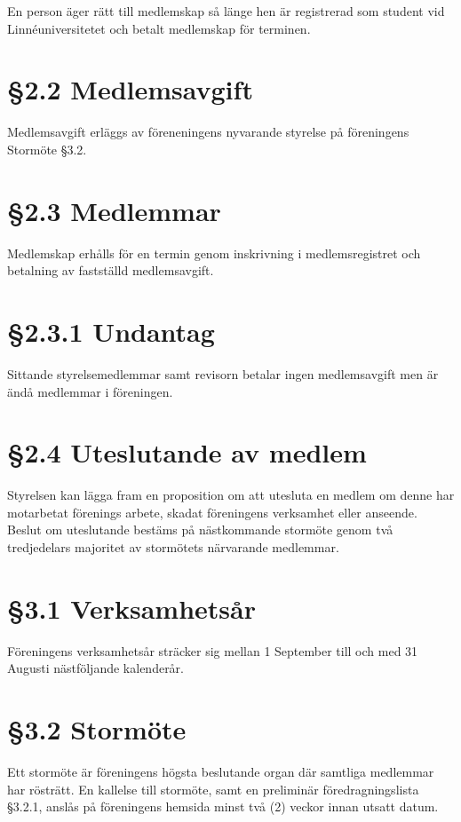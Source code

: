 \documentclass[]{article}
\begin{document}
En person äger rätt till medlemskap så länge hen är registrerad som
student vid Linnéuniversitetet och betalt medlemskap för terminen.

\section{§2.2 Medlemsavgift}\label{medlemsavgift}

Medlemsavgift erläggs av föreneningens nyvarande styrelse på föreningens
Stormöte §3.2.

\section{§2.3 Medlemmar}\label{medlemmar}

Medlemskap erhålls för en termin genom inskrivning i medlemsregistret
och betalning av fastställd medlemsavgift.

\section{§2.3.1 Undantag}\label{undantag}

Sittande styrelsemedlemmar samt revisorn betalar ingen medlemsavgift men
är ändå medlemmar i föreningen.

\section{§2.4 Uteslutande av medlem}\label{uteslutande-av-medlem}

Styrelsen kan lägga fram en proposition om att utesluta en medlem om
denne har motarbetat förenings arbete, skadat föreningens verksamhet
eller anseende. Beslut om uteslutande bestäms på nästkommande stormöte
genom två tredjedelars majoritet av stormötets närvarande medlemmar.

\section{§3.1 Verksamhetsår}\label{verksamhetsuxe5r}

Föreningens verksamhetsår sträcker sig mellan 1 September till och med
31 Augusti nästföljande kalenderår.

\section{§3.2 Stormöte}\label{stormuxf6te}

Ett stormöte är föreningens högsta beslutande organ där samtliga
medlemmar har rösträtt. En kallelse till stormöte, samt en preliminär
föredragningslista §3.2.1, anslås på föreningens hemsida minst två (2)
veckor innan utsatt datum.
\end{document}
